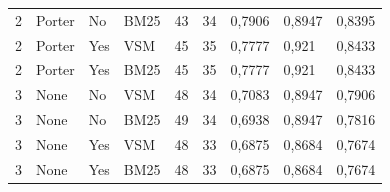 \begin{table}[h]
{\begin{tabular}{lllllllll}
\rowcolor[HTML]{C0C0C0} 
2                                   & Porter                         & No                               & BM25                            & 43                               & 34                              & 0,7906                           & 0,8947                        & 0,8395                         \\
\rowcolor[HTML]{C0C0C0} 
2                                   & Porter                         & Yes                              & VSM                             & 45                               & 35                              & 0,7777                           & 0,921                         & 0,8433                         \\
\rowcolor[HTML]{C0C0C0} 
2                                   & Porter                         & Yes                              & BM25                            & 45                               & 35                              & 0,7777                           & 0,921                         & 0,8433                         \\
\rowcolor[HTML]{9B9B9B} 
3                                   & None                           & No                               & VSM                             & 48                               & 34                              & 0,7083                           & 0,8947                        & 0,7906                         \\
\rowcolor[HTML]{9B9B9B} 
3                                   & None                           & No                               & BM25                            & 49                               & 34                              & 0,6938                           & 0,8947                        & 0,7816                         \\
\rowcolor[HTML]{9B9B9B} 
3                                   & None                           & Yes                              & VSM                             & 48                               & 33                              & 0,6875                           & 0,8684                        & 0,7674                         \\
\rowcolor[HTML]{9B9B9B} 
3                                   & None                           & Yes                              & BM25                            & 48                               & 33                              & 0,6875                           & 0,8684                        & 0,7674                         \\

\end{tabular}}
\end{table}
